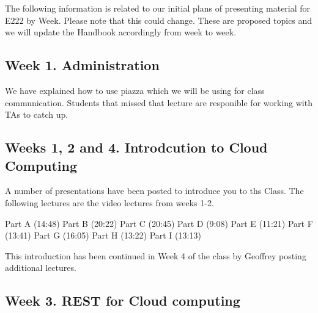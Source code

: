 \begin{WARNING}

The following information is related to our initial plans of
presenting material for E222 by Week. Please note that this could
change. These are proposed topics and we will update the Handbook
accordingly from week to week.

\end{WARNING}

\subsection{Week 1. Administration}

We have explained how to use piazza which we will be using for class
communication. Students that missed that lecture are responible for
working with TAs to catch up.

\subsection{Weeks 1, 2 and 4. Introdcution to Cloud Computing}

A number of presentations have been posted to introduce you to ths
Class. The following lectures are the video lectures from weeks 1-2.

Part A (14:48)
Part B (20:22)
Part C (20:45)
Part D (9:08)
Part E (11:21)
Part F (13:41)
Part G (16:05)
Part H (13:22)
Part I (13:13)

This introduction has been continued in Week 4 of the class by
Geoffrey posting additional lectures.



\subsection{Week 3. REST for Cloud computing }

